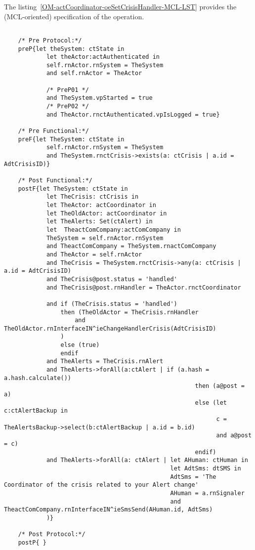 	\vspace{1cm}
	The listing~\ref{OM-actCoordinator-oeSetCrisisHandler-MCL-LST} provides the \msrmessir (MCL-oriented) specification of the operation.
	
	\scriptsize
	\vspace{0.5cm}
	\begin{lstlisting}[style=MessirStyle,firstnumber=auto,captionpos=b,caption={\msrmessir (MCL-oriented) specification of the operation \emph{oeSetCrisisHandler}.},label=OM-actCoordinator-oeSetCrisisHandler-MCL-LST]

	/* Pre Protocol:*/ 
	preP{let theSystem: ctState in
	  		let theActor:actAuthenticated in
	  		self.rnActor.rnSystem = TheSystem
	  		and self.rnActor = TheActor
	  
			/* PreP01 */
	  		and TheSystem.vpStarted = true
			/* PreP02 */
	  		and TheActor.rnctAuthenticated.vpIsLogged = true}
	
	/* Pre Functional:*/
	preF{let TheSystem: ctState in
			self.rnActor.rnSystem = TheSystem
			and TheSystem.rnctCrisis->exists(a: ctCrisis | a.id = AdtCrisisID)}
	
	/* Post Functional:*/ 
	postF{let TheSystem: ctState in
			let TheCrisis: ctCrisis in
			let TheActor: actCoordinator in
			let TheOldActor: actCoordinator in
			let TheAlerts: Set(ctAlert) in
			let  TheactComCompany:actComCompany in
			TheSystem = self.rnActor.rnSystem
			and TheactComCompany = TheSystem.rnactComCompany
			and TheActor = self.rnActor
			and TheCrisis = TheSystem.rnctCrisis->any(a: ctCrisis | a.id = AdtCrisisID)
			and TheCrisis@post.status = 'handled'
			and TheCrisis@post.rnHandler = TheActor.rnctCoordinator
			
			and if (TheCrisis.status = 'handled')
				then (TheOldActor = TheCrisis.rnHandler
					and TheOldActor.rnInterfaceIN^ieChangeHandlerCrisis(AdtCrisisID)
				)
				else (true)
				endif
			and TheAlerts = TheCrisis.rnAlert
			and TheAlerts->forAll(a:ctAlert | if (a.hash = a.hash.calculate()) 
													  then (a@post = a) 
													  else (let c:ctAlertBackup in
															c = TheAlertsBackup->select(b:ctAlertBackup | a.id = b.id)
															and a@post = c) 
													  endif)
			and TheAlerts->forAll(a: ctAlert | let AHuman: ctHuman in
											   let AdtSms: dtSMS in
											   AdtSms = 'The Coordinator of the crisis related to your Alert change'
											   AHuman = a.rnSignaler
											   and TheactComCompany.rnInterfaceIN^ieSmsSend(AHuman.id, AdtSms)
			)}
	
	/* Post Protocol:*/ 
	postP{ }
	
	\end{lstlisting}
	\normalsize 
	
	
	
	





